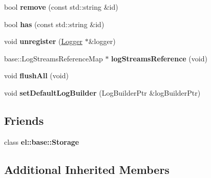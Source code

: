 \begin{DoxyCompactItemize}
\item 
\hypertarget{classel_1_1base_1_1RegisteredLoggers_a4d17dc9673f6aa6216571e182097400a}{bool {\bfseries remove} (const std\-::string \&id)}\label{classel_1_1base_1_1RegisteredLoggers_a4d17dc9673f6aa6216571e182097400a}

\item 
\hypertarget{classel_1_1base_1_1RegisteredLoggers_a85916925e2c53d1ebf9865625132a0be}{bool {\bfseries has} (const std\-::string \&id)}\label{classel_1_1base_1_1RegisteredLoggers_a85916925e2c53d1ebf9865625132a0be}

\item 
\hypertarget{classel_1_1base_1_1RegisteredLoggers_ad8fa8f829fdb6a03e6f5a38704811e7b}{void {\bfseries unregister} (\hyperlink{classel_1_1Logger}{Logger} $\ast$\&logger)}\label{classel_1_1base_1_1RegisteredLoggers_ad8fa8f829fdb6a03e6f5a38704811e7b}

\item 
\hypertarget{classel_1_1base_1_1RegisteredLoggers_a11eb24bac74b7ae2d85b324fed707819}{base\-::\-Log\-Streams\-Reference\-Map $\ast$ {\bfseries log\-Streams\-Reference} (void)}\label{classel_1_1base_1_1RegisteredLoggers_a11eb24bac74b7ae2d85b324fed707819}

\item 
\hypertarget{classel_1_1base_1_1RegisteredLoggers_abe6fdac67d9d4c35fb48c9fd88a49c2e}{void {\bfseries flush\-All} (void)}\label{classel_1_1base_1_1RegisteredLoggers_abe6fdac67d9d4c35fb48c9fd88a49c2e}

\item 
\hypertarget{classel_1_1base_1_1RegisteredLoggers_afccc4cf83c77e97cf7377513094b61a6}{void {\bfseries set\-Default\-Log\-Builder} (Log\-Builder\-Ptr \&log\-Builder\-Ptr)}\label{classel_1_1base_1_1RegisteredLoggers_afccc4cf83c77e97cf7377513094b61a6}

\end{DoxyCompactItemize}
\subsection*{Friends}
\begin{DoxyCompactItemize}
\item 
\hypertarget{classel_1_1base_1_1RegisteredLoggers_acc1efd1b8a3fc5e0028dab98b02e550a}{class {\bfseries el\-::base\-::\-Storage}}\label{classel_1_1base_1_1RegisteredLoggers_acc1efd1b8a3fc5e0028dab98b02e550a}

\end{DoxyCompactItemize}
\subsection*{Additional Inherited Members}


